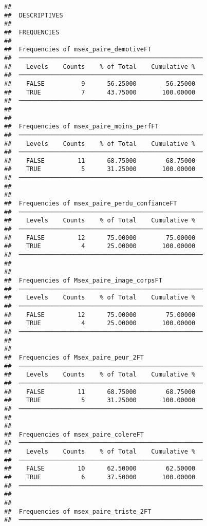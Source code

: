 \documentclass[
]{article}
\begin{document}
\begin{verbatim}
## 
##  DESCRIPTIVES
## 
##  FREQUENCIES
## 
##  Frequencies of msex_paire_demotiveFT               
##  ────────────────────────────────────────────────── 
##    Levels    Counts    % of Total    Cumulative %   
##  ────────────────────────────────────────────────── 
##    FALSE          9      56.25000        56.25000   
##    TRUE           7      43.75000       100.00000   
##  ────────────────────────────────────────────────── 
## 
## 
##  Frequencies of msex_paire_moins_perfFT             
##  ────────────────────────────────────────────────── 
##    Levels    Counts    % of Total    Cumulative %   
##  ────────────────────────────────────────────────── 
##    FALSE         11      68.75000        68.75000   
##    TRUE           5      31.25000       100.00000   
##  ────────────────────────────────────────────────── 
## 
## 
##  Frequencies of msex_paire_perdu_confianceFT        
##  ────────────────────────────────────────────────── 
##    Levels    Counts    % of Total    Cumulative %   
##  ────────────────────────────────────────────────── 
##    FALSE         12      75.00000        75.00000   
##    TRUE           4      25.00000       100.00000   
##  ────────────────────────────────────────────────── 
## 
## 
##  Frequencies of Msex_paire_image_corpsFT            
##  ────────────────────────────────────────────────── 
##    Levels    Counts    % of Total    Cumulative %   
##  ────────────────────────────────────────────────── 
##    FALSE         12      75.00000        75.00000   
##    TRUE           4      25.00000       100.00000   
##  ────────────────────────────────────────────────── 
## 
## 
##  Frequencies of Msex_paire_peur_2FT                 
##  ────────────────────────────────────────────────── 
##    Levels    Counts    % of Total    Cumulative %   
##  ────────────────────────────────────────────────── 
##    FALSE         11      68.75000        68.75000   
##    TRUE           5      31.25000       100.00000   
##  ────────────────────────────────────────────────── 
## 
## 
##  Frequencies of msex_paire_colereFT                 
##  ────────────────────────────────────────────────── 
##    Levels    Counts    % of Total    Cumulative %   
##  ────────────────────────────────────────────────── 
##    FALSE         10      62.50000        62.50000   
##    TRUE           6      37.50000       100.00000   
##  ────────────────────────────────────────────────── 
## 
## 
##  Frequencies of msex_paire_triste_2FT               
##  ────────────────────────────────────────────────── 

\end{verbatim}
\end{document}
